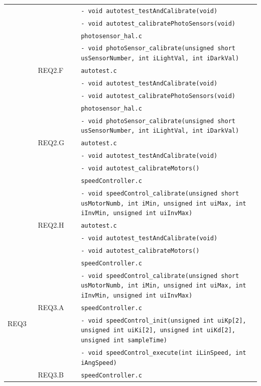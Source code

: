 \documentclass{article}
\begin{document}
\begin{longtable}{|p{0.125\linewidth}|p{0.17\linewidth}|p{0.75\linewidth}|}
        && \texttt{- void autotest\_testAndCalibrate(void)}\\
        && \texttt{- void autotest\_calibratePhotoSensors(void)}\\
        && \texttt{photosensor\_hal.c}\\
        && \texttt{- void photoSensor\_calibrate(unsigned short usSensorNumber, int iLightVal, int iDarkVal)}\\
		\cline{2-3}
        & REQ2.F & \texttt{autotest.c}\\ 
        && \texttt{- void autotest\_testAndCalibrate(void)}\\
        && \texttt{- void autotest\_calibratePhotoSensors(void)}\\
        && \texttt{photosensor\_hal.c}\\
        && \texttt{- void photoSensor\_calibrate(unsigned short usSensorNumber, int iLightVal, int iDarkVal)}\\
		\cline{2-3}
        & REQ2.G & \texttt{autotest.c}\\ 
        && \texttt{- void autotest\_testAndCalibrate(void)}\\
        && \texttt{- void autotest\_calibrateMotors()}\\
        && \texttt{speedController.c}\\
        && \texttt{- void speedControl\_calibrate(unsigned short usMotorNumb, int iMin, unsigned int uiMax, int iInvMin, unsigned int uiInvMax)}\\
		\cline{2-3}
        & REQ2.H & \texttt{autotest.c}\\ 
        && \texttt{- void autotest\_testAndCalibrate(void)}\\
        && \texttt{- void autotest\_calibrateMotors()}\\
        && \texttt{speedController.c}\\
        && \texttt{- void speedControl\_calibrate(unsigned short usMotorNumb, int iMin, unsigned int uiMax, int iInvMin, unsigned int uiInvMax)}\\
        \hline
        \multirow{2}{*}{REQ3}
        & REQ3.A & \texttt{speedController.c}\\ 
        && \texttt{- void speedControl\_init(unsigned int uiKp[2], unsigned int uiKi[2], unsigned int uiKd[2], unsigned int sampleTime)}\\
        && \texttt{- void speedControl\_execute(int iLinSpeed, int iAngSpeed)}\\
		\cline{2-3}
        & REQ3.B & \texttt{speedController.c}\\ 

\end{longtable}
\end{document}

